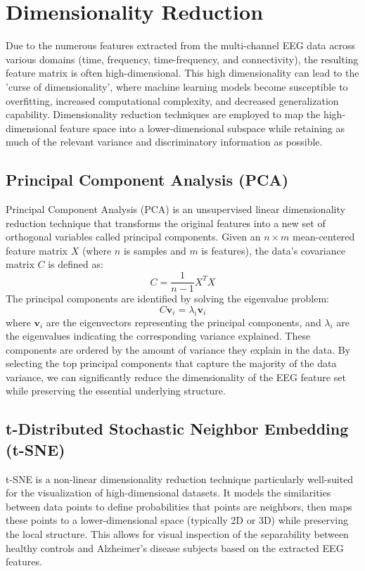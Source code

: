 \documentclass[openany]{book}
\begin{document}
\section{Dimensionality Reduction}
\label{sec:dim_red}
Due to the numerous features extracted from the multi-channel EEG data across various domains (time, frequency, time-frequency, and connectivity), the resulting feature matrix is often high-dimensional. This high dimensionality can lead to the 'curse of dimensionality', where machine learning models become susceptible to overfitting, increased computational complexity, and decreased generalization capability. Dimensionality reduction techniques are employed to map the high-dimensional feature space into a lower-dimensional subspace while retaining as much of the relevant variance and discriminatory information as possible.

\subsection{Principal Component Analysis (PCA)}
Principal Component Analysis (PCA) is an unsupervised linear dimensionality reduction technique that transforms the original features into a new set of orthogonal variables called principal components. Given an $n \times m$ mean-centered feature matrix $X$ (where $n$ is samples and $m$ is features), the data's covariance matrix $C$ is defined as:
\begin{equation}
    C = \frac{1}{n-1} X^T X
\end{equation}
The principal components are identified by solving the eigenvalue problem:
\begin{equation}
    C \mathbf{v}_i = \lambda_i \mathbf{v}_i
\end{equation}
where $\mathbf{v}_i$ are the eigenvectors representing the principal components, and $\lambda_i$ are the eigenvalues indicating the corresponding variance explained. These components are ordered by the amount of variance they explain in the data. By selecting the top principal components that capture the majority of the data variance, we can significantly reduce the dimensionality of the EEG feature set while preserving the essential underlying structure.

\subsection{t-Distributed Stochastic Neighbor Embedding (t-SNE)}
t-SNE is a non-linear dimensionality reduction technique particularly well-suited for the visualization of high-dimensional datasets. It models the similarities between data points to define probabilities that points are neighbors, then maps these points to a lower-dimensional space (typically 2D or 3D) while preserving the local structure. This allows for visual inspection of the separability between healthy controls and Alzheimer's disease subjects based on the extracted EEG features.
\end{document}
